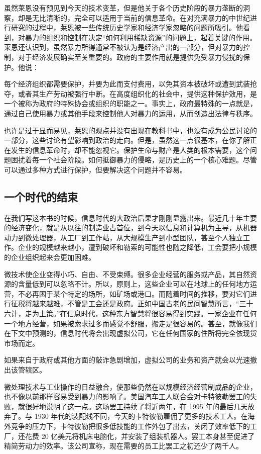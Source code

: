 虽然莱恩没有预见到今天的技术变革，但是他关于各个历史阶段的暴力垄断的洞察，却是无比清晰的，完全可以适用于当前的信息革命。在对充满暴力的中世纪进行研究的过程中，莱恩被一些传统历史学家和经济学家忽略的问题所吸引。他看到，对暴力的组织和控制在决定“如何利用稀缺资源”的问题上，起着关键的作用。莱恩还认识到，虽然暴力所得通常不被认为是经济产出的一部分，但对暴力的控制，对于经济发展确实至关重要的。政府的主要作用就是提供免受暴力侵扰的保护。他说：

\begin{tcolorbox}
\kaishu 每个经济组织都需要保护，并要为此而支付费用，以免其资本被破坏或遭到武装抢夺，或者其生产劳动被强行中断。在高度组织化的社会中，提供这种保护效用，是一个被称为政府的特殊协会或组织的职能之一。事实上，政府最特殊的一点就是，通过自己使用暴力或其他手段来控制他人对暴力的运用，从而创造出法律与秩序。
\end{tcolorbox}

也许是过于显而易见，莱恩的观点并没有出现在教科书中，也没有成为公民讨论的一部分，这些讨论有望影响到政治的走向。但是，虽然这一点很基本，在你了解正在发生的信息革命时，却不能忽视它。保护生命与财产是人类的根本需要，这个问题困扰着每一个社会阶段。如何抵御暴力的侵略，是历史上的一个核心难题。尽管可以通过多种方式进行保护，但要解决这个问题并不容易。

\subsection{一个时代的结束}
在我们写这本书的时候，信息时代的大政治后果才刚刚显露出来。最近几十年主要的经济变化，就是从以往的制造业占首位，到今天以信息和计算机为主导，从机器动力到微处理器，从工厂到工作站，从大规模生产到小型团队，甚至个人独立工作。企业的规模越来越小，遭到破坏和勒索的可能性也随之降低，工会要把小规模的企业组织起来会更加困难。

微技术使企业变得小巧、自由、不受束缚。很多企业经营的服务或产品，其自然资源的含量低到可以忽略不计。所以，原则上，这些企业可以在地球上的任何地方运营，不必再困于某个特定的场所，如矿场或港口。而随着时间的推移，要对它们进行征税将越来越难，不管是工会还是政府。正如中国古老的民间智慧所言，“三十六计，走为上策。”在信息时代，这种东方智慧将很容易得到实践。一家企业在任何一个地方经营，如果被索求过多而感觉不舒服，搬走是很容易的。甚至，就像我们在下文中预测的，信息时代将会出现虚拟公司，它在任何国家的住所将完全依现货市场而定。

如果来自于政府或其他方面的敲诈急剧增加，虚拟公司的业务和资产就会以光速撤出该管辖区。

微处理技术与工业操作的日益融合，使那些仍然在以规模经济经营制成品的企业，也不像以前那样容易受到暴力的影响了。美国汽车工人联合会对卡特彼勒罢工的失败，就很好地说明了这一点。这场罢工持续了将近两年，在 1995 年的最后几天放弃了。与 1930 年代的装配线不同，今天的卡特彼勒雇佣了更多的技术工人。在海外竞争的压力下，卡特彼勒把很多低技能的工作外包了出去，关闭了效率低下的工厂，还花费 20 亿美元将机床电脑化，并安装了组装机器人。罢工本身甚至促进了精简劳动力的效率。该公司宣称，现在需要的员工比罢工之初还少了两千人。

